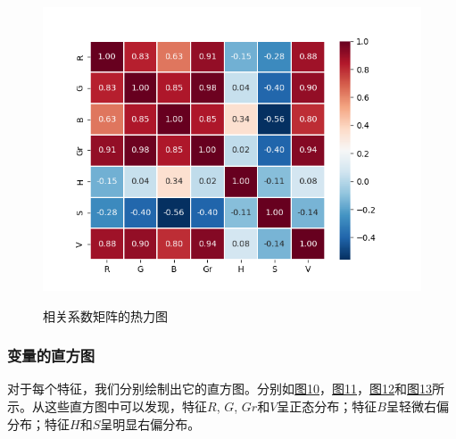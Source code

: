 \documentclass[UTF8]{ctexart}
\begin{document}
	\begin{figure}[htbp]
		\centering
		\caption{相关系数矩阵的热力图}
		\includegraphics[width=1.0\textwidth]{heatmap.png}
		\label{Fig.9}
	\end{figure}
	
	\subsubsection{变量的直方图}
	
	对于每个特征，我们分别绘制出它的直方图。分别如\hyperref[Fig.10]{图10}，\hyperref[Fig.11]{图11}，\hyperref[Fig.12]{图12}和\hyperref[Fig.13]{图13}所示。从这些直方图中可以发现，特征$R$, $G$, $Gr$和$V$呈正态分布；特征$B$呈轻微右偏分布；特征$H$和$S$呈明显右偏分布。
	
\end{document}
